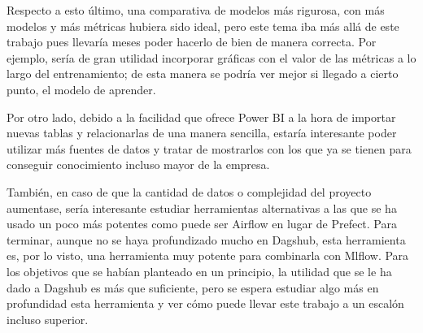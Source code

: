 Respecto a esto último, una comparativa de modelos más rigurosa, con más modelos y más métricas hubiera sido ideal, pero este tema iba más allá de este trabajo pues llevaría meses poder hacerlo de bien de manera correcta. Por ejemplo, sería de gran utilidad incorporar gráficas con el valor de las métricas a lo largo del entrenamiento; de esta manera se podría ver mejor si llegado a cierto punto, el modelo de aprender. 

Por otro lado, debido a la facilidad que ofrece Power BI a la hora de importar nuevas tablas y relacionarlas de una manera sencilla, estaría interesante poder utilizar más fuentes de datos y tratar de mostrarlos con los que ya se tienen para conseguir conocimiento incluso mayor de la empresa.

También, en caso de que la cantidad de datos o complejidad del proyecto aumentase, sería interesante estudiar herramientas alternativas a las que se ha usado un poco más potentes como puede ser Airflow en lugar de Prefect. Para terminar, aunque no se haya profundizado mucho en Dagshub, esta herramienta es, por lo visto, una herramienta muy potente para combinarla con Mlflow. Para los objetivos que se habían planteado en un principio, la utilidad que se le ha dado a Dagshub es más que suficiente, pero se espera estudiar algo más en profundidad esta herramienta y ver cómo puede llevar este trabajo a un escalón incluso superior.